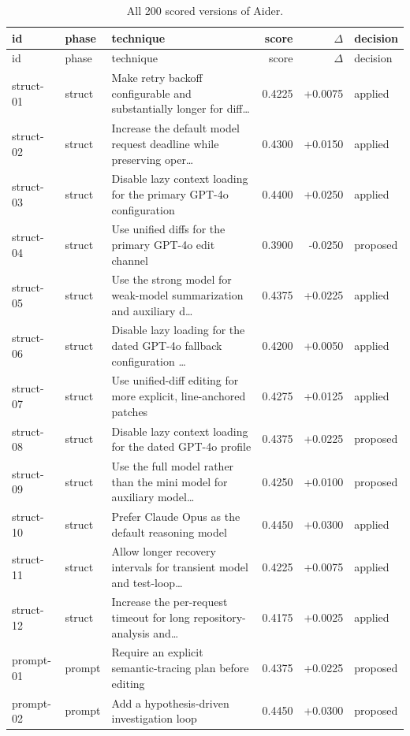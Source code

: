 \begin{center}\scriptsize\begin{longtable}{llp{5.2cm}rrl}
\caption{All 200 scored versions of Aider.}\\
\toprule id & phase & technique & score & $\Delta$ & decision \\ \midrule \endfirsthead
\toprule id & phase & technique & score & $\Delta$ & decision \\ \midrule \endhead
struct-01 & struct & Make retry backoff configurable and substantially longer for diff\ldots{} & 0.4225 & +0.0075 & applied \\
struct-02 & struct & Increase the default model request deadline while preserving oper\ldots{} & 0.4300 & +0.0150 & applied \\
struct-03 & struct & Disable lazy context loading for the primary GPT-4o configuration & 0.4400 & +0.0250 & applied \\
struct-04 & struct & Use unified diffs for the primary GPT-4o edit channel & 0.3900 & -0.0250 & proposed \\
struct-05 & struct & Use the strong model for weak-model summarization and auxiliary d\ldots{} & 0.4375 & +0.0225 & applied \\
struct-06 & struct & Disable lazy loading for the dated GPT-4o fallback configuration \ldots{} & 0.4200 & +0.0050 & applied \\
struct-07 & struct & Use unified-diff editing for more explicit, line-anchored patches & 0.4275 & +0.0125 & applied \\
struct-08 & struct & Disable lazy context loading for the dated GPT-4o profile & 0.4375 & +0.0225 & proposed \\
struct-09 & struct & Use the full model rather than the mini model for auxiliary model\ldots{} & 0.4250 & +0.0100 & proposed \\
struct-10 & struct & Prefer Claude Opus as the default reasoning model & 0.4450 & +0.0300 & applied \\
struct-11 & struct & Allow longer recovery intervals for transient model and test-loop\ldots{} & 0.4225 & +0.0075 & applied \\
struct-12 & struct & Increase the per-request timeout for long repository-analysis and\ldots{} & 0.4175 & +0.0025 & applied \\
prompt-01 & prompt & Require an explicit semantic-tracing plan before editing & 0.4375 & +0.0225 & proposed \\
prompt-02 & prompt & Add a hypothesis-driven investigation loop & 0.4450 & +0.0300 & proposed \\

\end{longtable}
\end{center}
